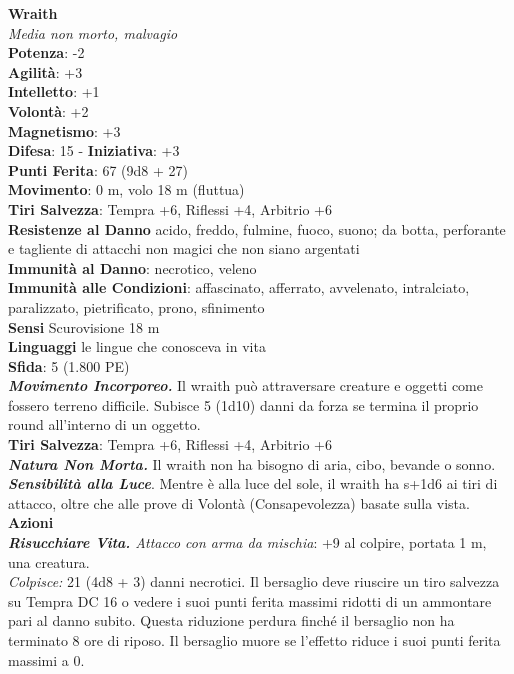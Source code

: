 \begin{multicols}{2}
\medskip\textbf{Wraith}\\
\emph{Media non morto, malvagio}\\
\textbf{Potenza}: -2\\
\textbf{Agilità}: +3\\
\textbf{Intelletto}: +1\\
\textbf{Volontà}: +2\\
\textbf{Magnetismo}: +3\\
\textbf{Difesa}: 15 - \textbf{Iniziativa}: +3\\
\textbf{Punti Ferita}: 67 (9d8 + 27)\\
\textbf{Movimento}: 0 m, volo 18 m (fluttua)\\
\textbf{Tiri Salvezza}: Tempra +6, Riflessi +4, Arbitrio +6\\
\textbf{Resistenze al Danno} acido, freddo, fulmine, fuoco, suono; da botta, perforante e tagliente di attacchi non magici che non siano argentati\\
\textbf{Immunità al Danno}: necrotico, veleno\\
\textbf{Immunità alle Condizioni}: affascinato, afferrato, avvelenato, intralciato, paralizzato, pietrificato, prono, sfinimento\\
\textbf{Sensi} Scurovisione 18 m\\
\textbf{Linguaggi} le lingue che conosceva in vita\\
\textbf{Sfida}: 5 (1.800 PE)\smallskip\\
\emph{\textbf{Movimento Incorporeo.}} Il wraith può attraversare creature e oggetti come fossero terreno difficile. Subisce 5 (1d10) danni da forza se termina il proprio round all'interno di un oggetto.\\
\textbf{Tiri Salvezza}: Tempra +6, Riflessi +4, Arbitrio +6\\
\emph{\textbf{Natura Non Morta.}} Il wraith non ha bisogno di aria, cibo, bevande o sonno.\\
\emph{\textbf{Sensibilità alla Luce}}. Mentre è alla luce del sole, il wraith ha s+1d6 ai tiri di attacco, oltre che alle prove di Volontà (Consapevolezza) basate sulla vista.\\
\smallskip\textbf{Azioni}\\
\emph{\textbf{Risucchiare Vita.} Attacco con arma da mischia}: +9 al colpire, portata 1 m, una creatura.\\
\emph{Colpisce:} 21 (4d8 + 3) danni necrotici. Il bersaglio deve riuscire un tiro salvezza su Tempra DC  16 o vedere i suoi punti ferita massimi ridotti di un ammontare pari al danno subito. Questa riduzione perdura finché il bersaglio non ha terminato 8 ore di riposo. Il bersaglio muore se l'effetto riduce i suoi punti ferita massimi a 0.\\


\end{multicols}
